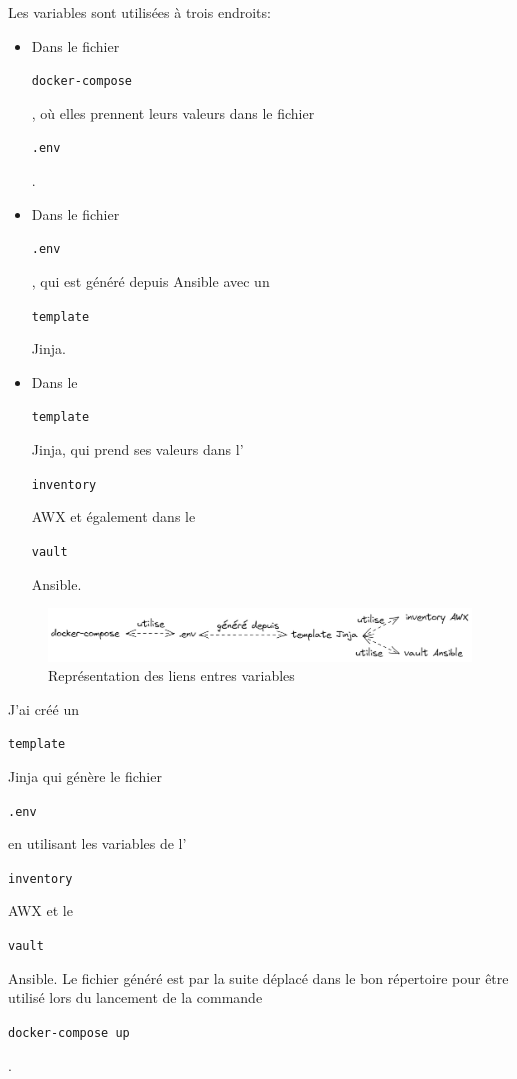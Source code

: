 \documentclass[12pt, a4paper, twoside]{article}
\begin{document}
Les variables sont utilisées à trois endroits:
\begin{itemize}
    \item Dans le fichier \begin{code}\texttt{docker-compose}\end{code}, où elles prennent leurs valeurs dans le fichier\begin{code}\texttt{.env}\end{code}.
    \item Dans le fichier\begin{code}\texttt{.env}\end{code}, qui est généré depuis \gls{Ansible} avec un \begin{code}\texttt{template}\end{code} \gls{Jinja}.
    \item Dans le \begin{code}\texttt{template}\end{code} \gls{Jinja}, qui prend ses valeurs dans l'\begin{code}\texttt{inventory}\end{code} AWX et également dans le \begin{code}\texttt{vault}\end{code} \gls{Ansible}.
\end{itemize}

\begin{figure}[!ht]
    \centering
    \includegraphics[width=\textwidth]{src/graph_variables_nextcloud.png}
    \caption{Représentation des liens entres variables}
    \label{fig:graph_variables_nextcloud}
\end{figure}

J'ai créé un \begin{code}\texttt{template}\end{code} \gls{Jinja} qui génère le fichier \begin{code}\texttt{.env}\end{code} en utilisant les variables de l'\begin{code}\texttt{inventory}\end{code} AWX et le \begin{code}\texttt{vault}\end{code} \gls{Ansible}.
Le fichier généré est par la suite déplacé dans le bon répertoire pour être utilisé lors du lancement de la commande \begin{code}\texttt{docker-compose up}\end{code}. 
\end{document}
